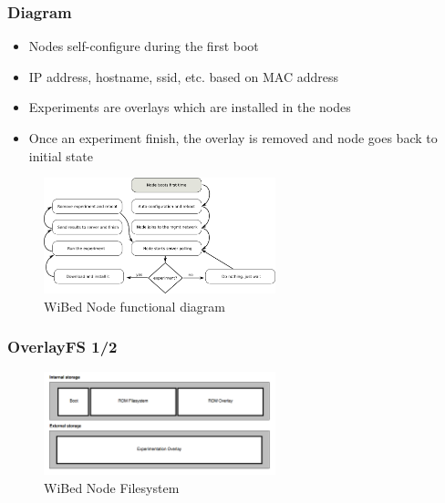 \documentclass[usepdftitle=false,13pt]{beamer}
\begin{document}
\begin{frame}\frametitle{Diagram}

	\begin{itemize}
	\item Nodes self-configure during the first boot
	\item IP address, hostname, ssid, etc. based on MAC address
	\item Experiments are overlays which are installed in the nodes
	\item Once an experiment finish, the overlay is removed and node goes back to initial state
	\end{itemize}

	\begin{figure}[h!]
	\begin{center}
	\includegraphics[width=0.6\textwidth]{pic/functdia}
	  \caption{WiBed Node functional diagram}
	\label{fig:funct}
	\end{center}
	\end{figure}
\end{frame}

\begin{frame}\frametitle{OverlayFS 1/2}

\begin{figure}[h!]
\begin{center}
\includegraphics[width=0.6\textwidth]{pic/firmfs1}
\caption{WiBed Node Filesystem}
\label{fig:wmn}
\end{center}
\end{figure}

\end{frame}
\end{document}
